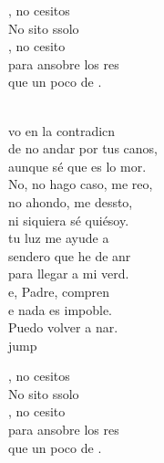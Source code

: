 \begin{cancion}[Un poco de fe][Ixcís]%
	\begin{chorus}%
	, no cesitos\\
	No sito ssolo  \\
	, no cesito \\
	para ansobre los res\\
	que un poco de .\\
	\end{chorus}%
	\jump\\
	vo en la contradicn\\
	de no andar por tus canos,\\
	aunque sé que es lo mor.\\
	No, no hago caso, me reo,\\
	no ahondo, me dessto,\\
	ni siquiera sé quiésoy.\\
	tu luz me ayude a\\
	 sendero que he de anr\\
	para llegar a mi verd.\\
	e, Padre, compren\\
	e nada es impoble.\\
	Puedo volver a nar.\\jump\\
	\begin{chorus}%
	, no cesitos\\
	No sito ssolo  \\
	, no cesito \\
	para ansobre los res\\
	que un poco de .\\
	\end{chorus}%
	\jump\\

\end{cancion}
